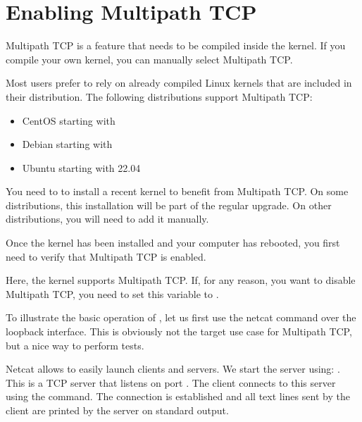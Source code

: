 \documentclass[letterpaper,10pt,english]{sphinxmanual}
\begin{document}
\section{Enabling Multipath TCP}
\label{\detokenize{mptcp-linux:enabling-multipath-tcp}}
\sphinxAtStartPar
Multipath TCP is a feature that needs to be compiled inside the kernel. If you compile your own kernel, you can manually select Multipath TCP.

\sphinxAtStartPar
Most users prefer to rely on already compiled Linux kernels that are included in their distribution. The following distributions support Multipath TCP:
\begin{itemize}
\item {} 
\sphinxAtStartPar
CentOS starting with

\item {} 
\sphinxAtStartPar
Debian starting with

\item {} 
\sphinxAtStartPar
Ubuntu starting with 22.04

\end{itemize}

\sphinxAtStartPar
You need to to install a recent kernel to benefit from Multipath TCP. On some distributions, this installation will be part of the regular upgrade. On other distributions, you will need to add it manually.

\sphinxAtStartPar
Once the kernel has been installed and your computer has rebooted, you first need to verify that Multipath TCP is enabled.

\begin{sphinxVerbatim}[commandchars=\\\{\}]
\end{sphinxVerbatim}

\sphinxAtStartPar
Here, the kernel supports Multipath TCP. If, for any reason, you want to disable Multipath TCP, you need to set this  variable to .

\sphinxAtStartPar
To illustrate the basic operation of , let us first use the netcat command over the loopback interface. This is obviously not the target use case for Multipath TCP, but a nice way to perform tests.

\sphinxAtStartPar
Netcat allows to easily launch clients and servers. We start the server using: . This is a TCP server that listens on port . The client connects to this server using the  command. The connection is established and all text lines sent by the client are printed by the server on standard output.
\end{document}
